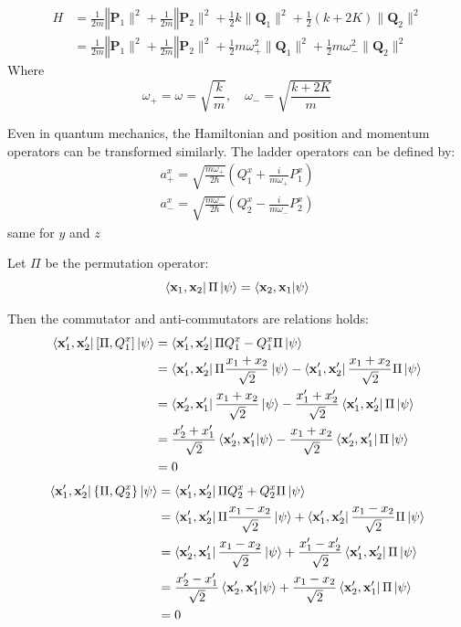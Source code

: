 \documentclass[a4paper,11pt]{article}
\begin{document}
\begin{align}
    H 
    &= \frac{1}{2m}\mathbf \|\mathbf P_1\|^2 + \frac{1}{2m}\mathbf \|\mathbf P_2\|^2+\frac{1}{2}k\|\mathbf Q_1\|^2+\frac{1}{2}(k + 2K)\|\mathbf Q_2\|^2 \\
    &= \frac{1}{2m}\mathbf \|\mathbf P_1\|^2 + \frac{1}{2m}\mathbf \|\mathbf P_2\|^2+\frac{1}{2}m\omega_+^2\|\mathbf Q_1\|^2+\frac{1}{2}m\omega_-^2\|\mathbf Q_2\|^2
\end{align}
Where
\begin{equation}
    \omega_+=\omega=\sqrt{\frac{k}{m}},\quad \omega_-=\sqrt{\frac{k + 2K}{m}}
\end{equation}

Even in quantum mechanics, the Hamiltonian and position and momentum operators can be transformed similarly. The ladder operators can be defined by:
\begin{gather}
    a_+^x 
    = \sqrt{\frac{m\omega_+}{2\hbar}}\left(Q_1^x+\frac{i}{m\omega_+}P_1^x\right) \\
    a_-^x 
    = \sqrt{\frac{m\omega_-}{2\hbar}}\left(Q_2^x-\frac{i}{m\omega_-}P_2^x\right)
\end{gather}
same for $y$ and $z$

Let $\Pi$ be the permutation operator:
\begin{equation}
    \bra{\mathbf x_1, \mathbf x_2}\Pi\ket{\psi} = \braket{\mathbf x_2, \mathbf x_1|\psi}
\end{equation}

Then the commutator and anti-commutators are relations holds:
\begin{align}
    \bra{\mathbf x_1', \mathbf x_2'}[\Pi, Q_1^x]\ket{\psi}
    &= \bra{\mathbf x_1', \mathbf x_2'}\Pi Q_1^x - Q_1^x\Pi\ket{\psi} \\
    &= \bra{\mathbf x_1', \mathbf x_2'}\Pi \frac{x_1+x_2}{\sqrt{2}}\ket{\psi} - \bra{\mathbf x_1', \mathbf x_2'}\frac{x_1+x_2}{\sqrt{2}}\Pi\ket{\psi}\\
    &= \bra{\mathbf x_2', \mathbf x_1'}\frac{x_1+x_2}{\sqrt{2}}\ket{\psi} - \frac{x_1'+x_2'}{\sqrt{2}}\bra{\mathbf x_1', \mathbf x_2'}\Pi\ket{\psi}\\
    &= \frac{x_2'+x_1'}{\sqrt{2}}\braket{\mathbf x_2', \mathbf x_1'|\psi} - \frac{x_1+x_2}{\sqrt{2}}\bra{\mathbf x_2', \mathbf x_1'}\Pi\ket{\psi}\\
    &= 0
\end{align}
\begin{align}
    \bra{\mathbf x_1', \mathbf x_2'}\{\Pi, Q_2^x\}\ket{\psi}
    &= \bra{\mathbf x_1', \mathbf x_2'}\Pi Q_2^x + Q_2^x\Pi\ket{\psi} \\
    &= \bra{\mathbf x_1', \mathbf x_2'}\Pi \frac{x_1-x_2}{\sqrt{2}}\ket{\psi} + \bra{\mathbf x_1', \mathbf x_2'}\frac{x_1-x_2}{\sqrt{2}}\Pi\ket{\psi}\\
    &= \bra{\mathbf x_2', \mathbf x_1'}\frac{x_1-x_2}{\sqrt{2}}\ket{\psi} + \frac{x_1'-x_2'}{\sqrt{2}}\bra{\mathbf x_1', \mathbf x_2'}\Pi\ket{\psi}\\
    &= \frac{x_2'-x_1'}{\sqrt{2}}\braket{\mathbf x_2', \mathbf x_1'|\psi} + \frac{x_1-x_2}{\sqrt{2}}\bra{\mathbf x_2', \mathbf x_1'}\Pi\ket{\psi}\\
    &= 0
\end{align}
\end{document}
